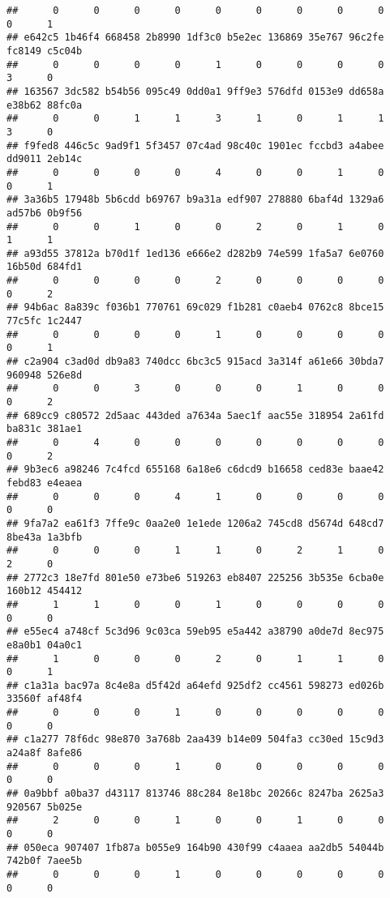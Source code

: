 \documentclass[
]{article}
\begin{document}
\begin{verbatim}
##      0      0      0      0      0      0      0      0      0      0      1 
## e642c5 1b46f4 668458 2b8990 1df3c0 b5e2ec 136869 35e767 96c2fe fc8149 c5c04b 
##      0      0      0      0      1      0      0      0      0      3      0 
## 163567 3dc582 b54b56 095c49 0dd0a1 9ff9e3 576dfd 0153e9 dd658a e38b62 88fc0a 
##      0      0      1      1      3      1      0      1      1      3      0 
## f9fed8 446c5c 9ad9f1 5f3457 07c4ad 98c40c 1901ec fccbd3 a4abee dd9011 2eb14c 
##      0      0      0      0      4      0      0      1      0      0      1 
## 3a36b5 17948b 5b6cdd b69767 b9a31a edf907 278880 6baf4d 1329a6 ad57b6 0b9f56 
##      0      0      1      0      0      2      0      1      0      1      1 
## a93d55 37812a b70d1f 1ed136 e666e2 d282b9 74e599 1fa5a7 6e0760 16b50d 684fd1 
##      0      0      0      0      2      0      0      0      0      0      2 
## 94b6ac 8a839c f036b1 770761 69c029 f1b281 c0aeb4 0762c8 8bce15 77c5fc 1c2447 
##      0      0      0      0      1      0      0      0      0      0      1 
## c2a904 c3ad0d db9a83 740dcc 6bc3c5 915acd 3a314f a61e66 30bda7 960948 526e8d 
##      0      0      3      0      0      0      1      0      0      0      2 
## 689cc9 c80572 2d5aac 443ded a7634a 5aec1f aac55e 318954 2a61fd ba831c 381ae1 
##      0      4      0      0      0      0      0      0      0      0      2 
## 9b3ec6 a98246 7c4fcd 655168 6a18e6 c6dcd9 b16658 ced83e baae42 febd83 e4eaea 
##      0      0      0      4      1      0      0      0      0      0      0 
## 9fa7a2 ea61f3 7ffe9c 0aa2e0 1e1ede 1206a2 745cd8 d5674d 648cd7 8be43a 1a3bfb 
##      0      0      0      1      1      0      2      1      0      2      0 
## 2772c3 18e7fd 801e50 e73be6 519263 eb8407 225256 3b535e 6cba0e 160b12 454412 
##      1      1      0      0      1      0      0      0      0      0      0 
## e55ec4 a748cf 5c3d96 9c03ca 59eb95 e5a442 a38790 a0de7d 8ec975 e8a0b1 04a0c1 
##      1      0      0      0      2      0      1      1      0      0      1 
## c1a31a bac97a 8c4e8a d5f42d a64efd 925df2 cc4561 598273 ed026b 33560f af48f4 
##      0      0      0      1      0      0      0      0      0      0      0 
## c1a277 78f6dc 98e870 3a768b 2aa439 b14e09 504fa3 cc30ed 15c9d3 a24a8f 8afe86 
##      0      0      0      1      0      0      0      0      0      0      0 
## 0a9bbf a0ba37 d43117 813746 88c284 8e18bc 20266c 8247ba 2625a3 920567 5b025e 
##      2      0      0      1      0      0      1      0      0      0      0 
## 050eca 907407 1fb87a b055e9 164b90 430f99 c4aaea aa2db5 54044b 742b0f 7aee5b 
##      0      0      0      1      0      0      0      0      0      0      0 

\end{verbatim}
\end{document}

